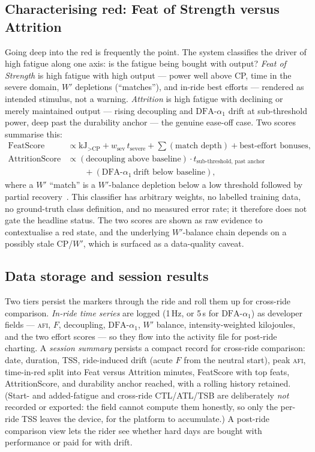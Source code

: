 \documentclass[11pt]{article}
\newcommand{\afi}{\textup{\textsc{afi}}}
\newcommand{\aone}{\ensuremath{\text{DFA-}\alpha_1}}
\newcommand{\Fstate}{\ensuremath{F}}
\begin{document}
\subsection{Characterising red: Feat of Strength versus Attrition}\label{sec:featattr}
Going deep into the red is frequently the point. The system classifies the driver of high fatigue along one axis: is the fatigue being bought with output? \emph{Feat of Strength} is high fatigue with high output --- power well above CP, time in the severe domain, $W'$ depletions (``matches''), and in-ride best efforts --- rendered as intended stimulus, not a warning. \emph{Attrition} is high fatigue with declining or merely maintained output --- rising decoupling and $\aone$ drift at sub-threshold power, deep past the durability anchor --- the genuine ease-off case. Two scores summarise this:
\begin{align}
\text{FeatScore} &\propto \text{kJ}_{>\text{CP}} + w_{\text{sev}}\,t_{\text{severe}} + \textstyle\sum(\text{match depth}) + \text{best-effort bonuses},\nonumber\\
\text{AttritionScore} &\propto (\text{decoupling above baseline})\cdot t_{\text{sub-threshold, past anchor}}\nonumber\\
&\qquad + (\aone\ \text{drift below baseline}),
\label{eq:scores}
\end{align}
where a $W'$ ``match'' is a $W'$-balance depletion below a low threshold followed by partial recovery~\cite{skiba}. This classifier has arbitrary weights, no labelled training data, no ground-truth class definition, and no measured error rate; it therefore does not gate the headline status. The two scores are shown as raw evidence to contextualise a red state, and the underlying $W'$-balance chain depends on a possibly stale CP/$W'$, which is surfaced as a data-quality caveat.

\subsection{Data storage and session results}\label{sec:storage}
Two tiers persist the markers through the ride and roll them up for cross-ride comparison. \emph{In-ride time series} are logged (1\,Hz, or 5\,s for $\aone$) as developer fields --- \afi{}, $\Fstate$, decoupling, $\aone$, $W'$ balance, intensity-weighted kilojoules, and the two effort scores --- so they flow into the activity file for post-ride charting. A \emph{session summary} persists a compact record for cross-ride comparison: date, duration, TSS, ride-induced drift (acute $\Fstate$ from the neutral start), peak \afi{}, time-in-red split into Feat versus Attrition minutes, FeatScore with top feats, AttritionScore, and durability anchor reached, with a rolling history retained. (Start- and added-fatigue and cross-ride CTL/ATL/TSB are deliberately \emph{not} recorded or exported: the field cannot compute them honestly, so only the per-ride TSS leaves the device, for the platform to accumulate.) A post-ride comparison view lets the rider see whether hard days are bought with performance or paid for with drift.
\end{document}
